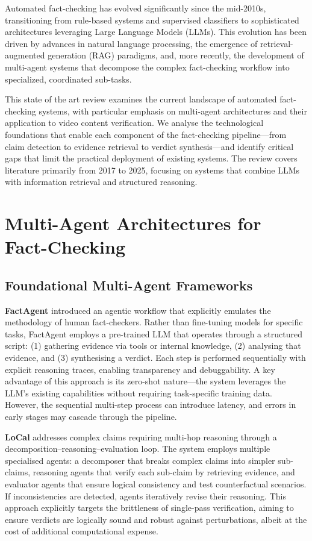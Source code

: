 \documentclass[12pt,a4paper]{article}
\begin{document}
Automated fact-checking has evolved significantly since the mid-2010s, transitioning from rule-based systems and supervised classifiers to sophisticated architectures leveraging Large Language Models (LLMs). This evolution has been driven by advances in natural language processing, the emergence of retrieval-augmented generation (RAG) paradigms, and, more recently, the development of multi-agent systems that decompose the complex fact-checking workflow into specialized, coordinated sub-tasks.

This state of the art review examines the current landscape of automated fact-checking systems, with particular emphasis on multi-agent architectures and their application to video content verification. We analyse the technological foundations that enable each component of the fact-checking pipeline—from claim detection to evidence retrieval to verdict synthesis—and identify critical gaps that limit the practical deployment of existing systems. The review covers literature primarily from 2017 to 2025, focusing on systems that combine LLMs with information retrieval and structured reasoning.

\section{Multi-Agent Architectures for Fact-Checking}

\subsection{Foundational Multi-Agent Frameworks}

\textbf{FactAgent} \citep{hysonlab2025factagent} introduced an agentic workflow that explicitly emulates the methodology of human fact-checkers. Rather than fine-tuning models for specific tasks, FactAgent employs a pre-trained LLM that operates through a structured script: (1) gathering evidence via tools or internal knowledge, (2) analysing that evidence, and (3) synthesising a verdict. Each step is performed sequentially with explicit reasoning traces, enabling transparency and debuggability. A key advantage of this approach is its zero-shot nature—the system leverages the LLM's existing capabilities without requiring task-specific training data. However, the sequential multi-step process can introduce latency, and errors in early stages may cascade through the pipeline.

\textbf{LoCal} \citep{chen2024local} addresses complex claims requiring multi-hop reasoning through a decomposition–reasoning–evaluation loop. The system employs multiple specialised agents: a decomposer that breaks complex claims into simpler sub-claims, reasoning agents that verify each sub-claim by retrieving evidence, and evaluator agents that ensure logical consistency and test counterfactual scenarios. If inconsistencies are detected, agents iteratively revise their reasoning. This approach explicitly targets the brittleness of single-pass verification, aiming to ensure verdicts are logically sound and robust against perturbations, albeit at the cost of additional computational expense.
\end{document}

